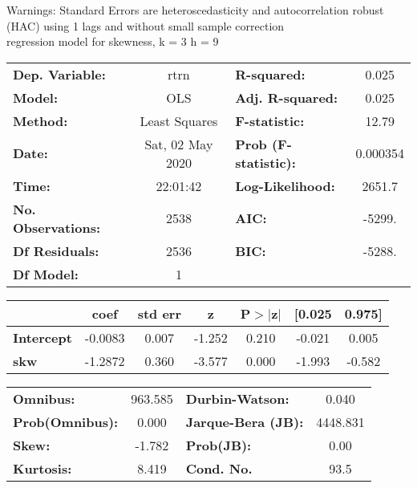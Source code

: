 Warnings: \newline
 [1] Standard Errors are heteroscedasticity and autocorrelation robust (HAC) using 1 lags and without small sample correction\\ 

regression model for skewness, k = 3 h = 9\begin{center}
\begin{tabular}{lclc}
\toprule
\textbf{Dep. Variable:}    &       rtrn       & \textbf{  R-squared:         } &     0.025   \\
\textbf{Model:}            &       OLS        & \textbf{  Adj. R-squared:    } &     0.025   \\
\textbf{Method:}           &  Least Squares   & \textbf{  F-statistic:       } &     12.79   \\
\textbf{Date:}             & Sat, 02 May 2020 & \textbf{  Prob (F-statistic):} &  0.000354   \\
\textbf{Time:}             &     22:01:42     & \textbf{  Log-Likelihood:    } &    2651.7   \\
\textbf{No. Observations:} &        2538      & \textbf{  AIC:               } &    -5299.   \\
\textbf{Df Residuals:}     &        2536      & \textbf{  BIC:               } &    -5288.   \\
\textbf{Df Model:}         &           1      & \textbf{                     } &             \\
\bottomrule
\end{tabular}
\begin{tabular}{lcccccc}
                   & \textbf{coef} & \textbf{std err} & \textbf{z} & \textbf{P$> |$z$|$} & \textbf{[0.025} & \textbf{0.975]}  \\
\midrule
\textbf{Intercept} &      -0.0083  &        0.007     &    -1.252  &         0.210        &       -0.021    &        0.005     \\
\textbf{skw}       &      -1.2872  &        0.360     &    -3.577  &         0.000        &       -1.993    &       -0.582     \\
\bottomrule
\end{tabular}
\begin{tabular}{lclc}
\textbf{Omnibus:}       & 963.585 & \textbf{  Durbin-Watson:     } &    0.040  \\
\textbf{Prob(Omnibus):} &   0.000 & \textbf{  Jarque-Bera (JB):  } & 4448.831  \\
\textbf{Skew:}          &  -1.782 & \textbf{  Prob(JB):          } &     0.00  \\
\textbf{Kurtosis:}      &   8.419 & \textbf{  Cond. No.          } &     93.5  \\
\bottomrule
\end{tabular}
\end{center}

